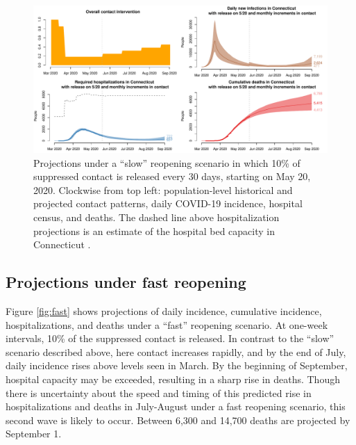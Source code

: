 \documentclass[11pt]{article}
\begin{document}
\begin{figure}
\centering
\includegraphics[width=\textwidth]{figures/slow.pdf}
\caption{Projections under a ``slow'' reopening scenario in which 10\% of suppressed contact is released every 30 days, starting on May 20, 2020. Clockwise from top left: population-level historical and projected contact patterns, daily COVID-19 incidence, hospital census, and deaths. The dashed line above hospitalization projections is an estimate of the hospital bed capacity in Connecticut \citep{cha}. }

\label{fig:slow}
\end{figure}



\subsection*{Projections under fast reopening} 

Figure \ref{fig:fast} shows projections of daily incidence, cumulative incidence, hospitalizations, and deaths under a ``fast'' reopening scenario. At one-week intervals, 10\% of the suppressed contact is released.   In contrast to the ``slow'' scenario described above, here contact increases rapidly, and by the end of July, daily incidence rises above levels seen in March.  By the beginning of September, hospital capacity may be exceeded, resulting in a sharp rise in deaths.  Though there is uncertainty about the speed and timing of this predicted rise in hospitalizations and deaths in July-August under a fast reopening scenario, this second wave is likely to occur. Between 6,300 and 14,700 deaths are projected by September 1.  
\end{document}
